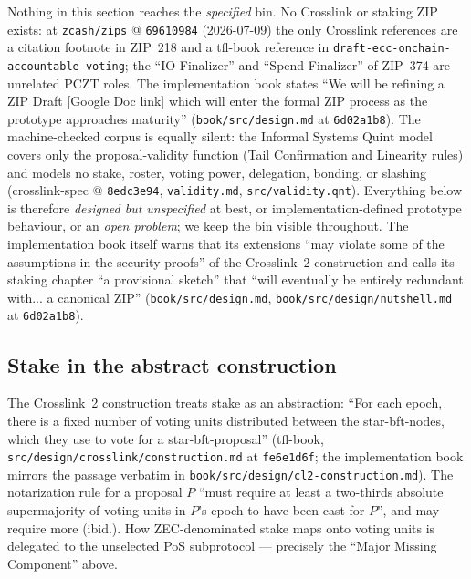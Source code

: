 \documentclass[11pt,a4paper]{article}
\theoremstyle{definition}
\begin{document}
Nothing in this section reaches the \emph{specified} bin. No Crosslink or
staking ZIP exists: at \texttt{zcash/zips} @ \texttt{69610984}
(2026-07-09) the only Crosslink references are a citation footnote in
ZIP~218 and a tfl-book reference in
\texttt{draft-ecc-onchain-accountable-voting}; the ``IO Finalizer'' and
``Spend Finalizer'' of ZIP~374 are unrelated PCZT roles. The implementation
book states ``We will be refining a ZIP Draft [Google Doc link] which will
enter the formal ZIP process as the prototype approaches maturity''
(\texttt{book/src/design.md} at \texttt{6d02a1b8}). The machine-checked
corpus is equally silent: the Informal Systems Quint model covers only the
proposal-validity function (Tail Confirmation and Linearity rules) and
models no stake, roster, voting power, delegation, bonding, or slashing
(crosslink-spec @ \texttt{8edc3e94}, \texttt{validity.md},
\texttt{src/validity.qnt}).
Everything below is therefore \emph{designed but unspecified} at best, or
implementation-defined prototype behaviour, or an \emph{open problem}; we
keep the bin visible throughout. The implementation book itself warns that
its extensions ``may violate some of the assumptions in the security
proofs'' of the Crosslink~2 construction and calls its staking chapter ``a
provisional sketch'' that ``will eventually be entirely redundant with...
a canonical ZIP'' (\texttt{book/src/design.md},
\texttt{book/src/design/nutshell.md} at \texttt{6d02a1b8}).

\subsection{Stake in the abstract construction}\label{sec:xl-stake-abstract}

The Crosslink~2 construction treats stake as an abstraction: ``For each
epoch, there is a fixed number of voting units distributed between the
star-bft-nodes, which they use to vote for a star-bft-proposal''
(tfl-book, \texttt{src/design/crosslink/construction.md} at
\texttt{fe6e1d6f}; the implementation book mirrors the passage verbatim in
\texttt{book/src/design/cl2-construction.md}). The notarization rule for a
proposal $P$ ``must require at least a two-thirds absolute supermajority
of voting units in $P$'s epoch to have been cast for $P$'', and may
require more (ibid.). How ZEC-denominated stake maps onto voting units is
delegated to the unselected PoS subprotocol --- precisely the ``Major
Missing Component'' above.
\end{document}
